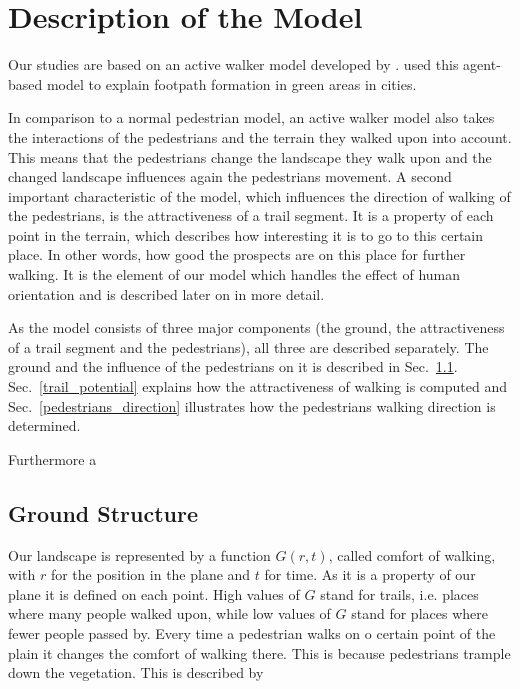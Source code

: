 \section{Description of the Model}

Our studies are based on an active walker model developed by \cite{helbing:1997}. \cite{helbing:1997} used this agent-based model to explain footpath formation in green areas in cities.

In comparison to a normal pedestrian model, an active walker model also takes the interactions of the pedestrians and the terrain they walked upon into account. This means that the pedestrians change the landscape they walk upon and the changed landscape influences again the pedestrians movement. A second important characteristic of the model, which influences the direction of walking of the pedestrians, is the attractiveness of a trail segment. It is a property of each point in the terrain, which describes how interesting it is to go to this certain place. In other words, how good the prospects are on this place for further walking. It is the element of our model which handles the effect of human orientation and is described later on in more detail.

As the model consists of three major components (the ground, the attractiveness of a trail segment and the pedestrians), all three are described separately. The ground and the influence of the pedestrians on it is described in Sec.\ \ref{ground_structure}. Sec.\ \ref{trail_potential} explains how the attractiveness of walking is computed and Sec.\ \ref{pedestrians_direction} illustrates how the pedestrians walking direction is determined.

Furthermore a 

\subsection{Ground Structure}
\label{ground_structure}

Our landscape is represented by a function $G(r,t)$, called comfort of walking, with $r$ for the position in the plane and $t$ for time. As it is a property of our plane it is defined on each point. High values of $G$ stand for trails, i.e. places where many people walked upon, while low values of $G$ stand for places where fewer people passed by. Every time a pedestrian walks on o certain point of the plain it changes the comfort of walking there. This is because pedestrians trample down the vegetation. This is described by

